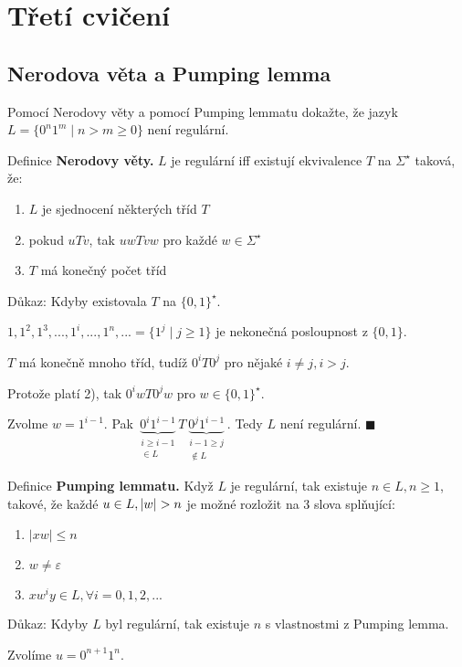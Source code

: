 \section{Třetí cvičení}

\subsection{Nerodova věta a Pumping lemma}
Pomocí Nerodovy věty a pomocí Pumping lemmatu dokažte, že jazyk $L = \{0^n 1^m \mid n > m \geq 0\}$ není regulární.

\noindent
Definice \textbf{Nerodovy věty.} $L$ je regulární iff existují ekvivalence $T$ na $\Sigma^\star$ taková, že:
\begin{enumerate}[1), noitemsep]
    \item $L$ je sjednocení některých tříd $T$
    \item pokud $uTv$, tak $uwTvw$ pro každé $w \in \Sigma^\star$
    \item $T$ má konečný počet tříd
\end{enumerate}
Důkaz:
Kdyby existovala $T$ na $\{0,1\}^\star$.

$1, 1^2, 1^3, ..., 1^i, ..., 1^n, ... = \{1^j \mid j \geq 1\}$ je nekonečná posloupnost z $\{0,1\}$.

$T$ má konečně mnoho tříd, tudíž $0^i T 0^j$ pro nějaké $i \not= j, i>j$.

Protože platí 2), tak $0^i w T 0^j w$ pro $w \in \{0,1\}^\star$.

Zvolme $w = 1^{i-1}$. Pak $\underbrace{0^i 1^{i-1}}_{\substack{i \geq i-1 \\ \in L}} T 
\underbrace{0^j 1^{i-1}}_{\substack{i-1 \geq j  \\\not\in L }}$. Tedy $L$ není regulární. $\blacksquare$

\noindent
Definice \textbf{Pumping lemmatu.} Když $L$ je regulární, tak existuje $n \in L, n \geq 1$, takové, že každé ${u \in L},\\
|w| > n$ je 
možné rozložit na 3 slova splňující:
\begin{enumerate}[1), noitemsep]
    \item $|xw| \leq n$
    \item $w \not= \varepsilon$
    \item $xw^i y \in L, \forall i = 0, 1, 2, ...$
\end{enumerate}
Důkaz:
Kdyby $L$ byl regulární, tak existuje $n$ s vlastnostmi z Pumping lemma.

Zvolíme $u = 0^{n+1} 1^n$.

